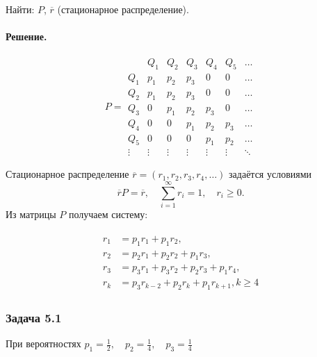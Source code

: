 Найти: $P$, $\overline{r}$ (стационарное распределение).
\paragraph{Решение.}

\[
	P =
	\begin{array}{c|cccccc}
		       & Q_1    & Q_2    & Q_3    & Q_4    & Q_5    & \ldots \\
		\hline
		Q_1    & p_1    & p_2    & p_3    & 0      & 0      & \ldots \\
		Q_2    & p_1    & p_2    & p_3    & 0      & 0      & \ldots \\
		Q_3    & 0      & p_1    & p_2    & p_3    & 0      & \ldots \\
		Q_4    & 0      & 0      & p_1    & p_2    & p_3    & \ldots \\
		Q_5    & 0      & 0      & 0      & p_1    & p_2    & \ldots \\
		\vdots & \vdots & \vdots & \vdots & \vdots & \vdots & \ddots
	\end{array}
\]

Стационарное распределение $\overline r=(r_1,r_2,r_3,r_4,\ldots)$ задаётся условиями
\[
	\overline r P = \overline r,\quad \sum_{i=1}^\infty r_i = 1,\quad r_i\ge0.
\]
Из матрицы $P$ получаем систему:

\[
	\begin{array}{rcl}
		\begin{aligned}
			r_1 & = p_1 r_1 + p_1 r_2,                           \\
			r_2 & = p_2 r_1 + p_2 r_2 + p_1 r_3,                 \\
			r_3 & = p_3 r_1 + p_3 r_2 + p_2 r_3 + p_1 r_4,       \\
			r_k & = p_3 r_{k-2} + p_2 r_k + p_1 r_{k+1}, k\geq 4
		\end{aligned}
	\end{array}
\]


\subsubsection*{Задача 5.1}

При вероятностях $p_1=\tfrac{1}{2},\quad p_2=\tfrac{1}{4},\quad p_3=\tfrac{1}{4}$

